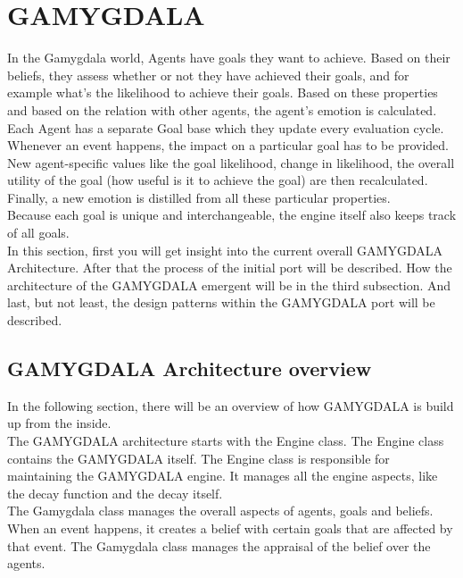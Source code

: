 \section{GAMYGDALA}
In the Gamygdala world, Agents have goals they want to achieve. Based on their beliefs, they assess whether or not they have achieved their goals, and for example what's the likelihood to achieve their goals. Based on these properties and based on the relation with other agents, the agent's emotion is calculated. \\ 

Each Agent has a separate Goal base which they update every evaluation cycle. Whenever an event happens, the impact on a particular goal has to be provided. New agent-specific values like the goal likelihood, change in likelihood, the overall utility of the goal (how useful is it to achieve the goal) are then recalculated. Finally, a new emotion is distilled from all these particular properties. \\

Because each goal is unique and interchangeable, the engine itself also keeps track of all goals. \\

In this section, first you will get insight into the current overall GAMYGDALA Architecture. After that the process of the initial port will be described. How the architecture of the GAMYGDALA emergent will be in the third subsection. And last, but not least, the design patterns within the GAMYGDALA port will be described. 

\subsection{GAMYGDALA Architecture overview}
In the following section, there will be an overview of how GAMYGDALA is build up from the inside. \\

The GAMYGDALA architecture starts with the Engine class. The Engine class contains the GAMYGDALA itself. The Engine class is responsible for maintaining the GAMYGDALA engine. It manages all the engine aspects, like the decay function and the decay itself. \\

The Gamygdala class manages the overall aspects of agents, goals and beliefs. When an event happens, it creates a belief with certain goals that are affected by that event. The Gamygdala class manages the appraisal of the belief over the agents. \\

